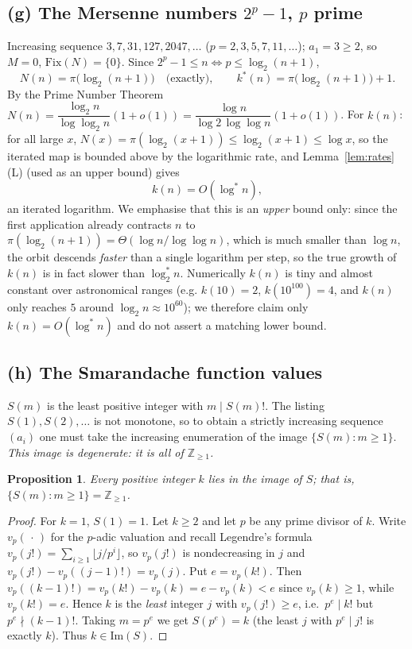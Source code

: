 \documentclass[12pt]{article}
\newtheorem{proposition}{Proposition}
\theoremstyle{definition}
\begin{document}
\subsection{(g) The Mersenne numbers $2^p-1$, $p$ prime}
Increasing sequence $3,7,31,127,2047,\dots$ ($p=2,3,5,7,11,\dots$); $a_1=3\ge2$, so
$M=0$, $\mathrm{Fix}(N)=\{0\}$. Since $2^p-1\le n\iff p\le\log_2(n+1)$,
\[
  N(n)=\pi\bigl(\log_2(n+1)\bigr)\quad\text{(exactly)},\qquad
  k^*(n)=\pi\bigl(\log_2(n+1)\bigr)+1.
\]
By the Prime Number Theorem $N(n)=\dfrac{\log_2 n}{\log\log_2 n}(1+o(1))
=\dfrac{\log n}{\log2\,\log\log n}(1+o(1))$. For $k(n)$: for all large $x$,
$N(x)=\pi(\log_2(x+1))\le\log_2(x+1)\le\log x$, so the iterated map is bounded above
by the logarithmic rate, and Lemma~\ref{lem:rates}(L) (used as an upper bound) gives
\[
  k(n)=O(\log^* n),
\]
an iterated logarithm. We emphasise that this is an \emph{upper} bound only: since the
first application already contracts $n$ to $\pi(\log_2(n+1))=\Theta(\log n/\log\log n)$,
which is much smaller than $\log n$, the orbit descends \emph{faster} than a single
logarithm per step, so the true growth of $k(n)$ is in fact slower than $\log^*_2 n$.
Numerically $k(n)$ is tiny and almost constant over astronomical ranges (e.g.
$k(10)=2$, $k(10^{100})=4$, and $k(n)$ only reaches $5$ around $\log_2 n\approx10^{60}$);
we therefore claim only $k(n)=O(\log^* n)$ and do not assert a matching lower bound.

\subsection{(h) The Smarandache function values}
$S(m)$ is the least positive integer with $m\mid S(m)!$. The listing $S(1),S(2),\dots$
is not monotone, so to obtain a strictly increasing sequence $(a_i)$ one must take the
increasing enumeration of the image $\{S(m):m\ge1\}$. \emph{This image is degenerate:
it is all of $\mathbb Z_{\ge1}$.}

\begin{proposition}\label{prop:smar}
Every positive integer $k$ lies in the image of $S$; that is, $\{S(m):m\ge1\}=\mathbb
Z_{\ge1}$.
\end{proposition}

\begin{proof}
For $k=1$, $S(1)=1$. Let $k\ge2$ and let $p$ be any prime divisor of $k$. Write
$v_p(\,\cdot\,)$ for the $p$-adic valuation and recall Legendre's formula
$v_p(j!)=\sum_{i\ge1}\lfloor j/p^i\rfloor$, so $v_p(j!)$ is nondecreasing in $j$ and
$v_p(j!)-v_p((j-1)!)=v_p(j)$. Put $e=v_p(k!)$. Then
$v_p((k-1)!)=v_p(k!)-v_p(k)=e-v_p(k)<e$ since $v_p(k)\ge1$, while $v_p(k!)=e$. Hence
$k$ is the \emph{least} integer $j$ with $v_p(j!)\ge e$, i.e.\ $p^e\mid k!$ but
$p^e\nmid (k-1)!$. Taking $m=p^e$ we get $S(p^e)=k$ (the least $j$ with $p^e\mid j!$
is exactly $k$). Thus $k\in\mathrm{Im}(S)$.
\end{proof}
\end{document}
